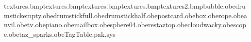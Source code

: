 textures\postcard.bmp textures\stamp.bmp textures\keeperbutton.bmp textures\rope.bmp textures\manyan2.bmp bubble.obe drumstickempty.obe drumstickfull.obe drumstickhalf.obe postcard.obe box.obe rope.obe anvil.obe tv.obe piano.obe mailbox.obe sphere04.obe restaztop.obe cloudwacky.obe scope.obe taz_sparks.obe TagTable.pak.sys 